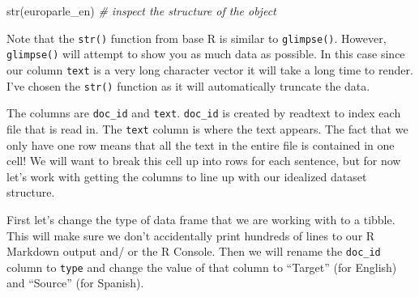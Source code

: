 \documentclass[
  letterpaper,
  DIV=11,
  numbers=noendperiod]{scrreport}
\newenvironment{Shaded}{\begin{snugshade}}{\end{snugshade}}
\newcommand{\CommentTok}[1]{\textcolor[rgb]{0.00,0.00,0.00}{\textit{#1}}}
\newcommand{\FunctionTok}[1]{\textcolor[rgb]{0.00,0.00,0.00}{#1}}
\newcommand{\NormalTok}[1]{\textcolor[rgb]{0.00,0.00,0.00}{#1}}
\theoremstyle{definition}
\theoremstyle{remark}
\begin{document}
\begin{Shaded}
\begin{Highlighting}[]
\FunctionTok{str}\NormalTok{(europarle\_en) }\CommentTok{\# inspect the structure of the object}
\end{Highlighting}
\end{Shaded}

\begin{tcolorbox}[enhanced jigsaw, breakable, arc=.35mm, opacityback=0, bottomrule=.15mm, colback=white, opacitybacktitle=0.6, colframe=quarto-callout-warning-color-frame, toptitle=1mm, colbacktitle=quarto-callout-warning-color!10!white, left=2mm, leftrule=.75mm, toprule=.15mm, title=\textcolor{quarto-callout-warning-color}{\faExclamationTriangle}\hspace{0.5em}{Tip}, bottomtitle=1mm, coltitle=black, titlerule=0mm, rightrule=.15mm]

Note that the \texttt{str()} function from base R is similar to
\texttt{glimpse()}. However, \texttt{glimpse()} will attempt to show you
as much data as possible. In this case since our column \texttt{text} is
a very long character vector it will take a long time to render. I've
chosen the \texttt{str()} function as it will automatically truncate the
data.

\end{tcolorbox}

The columns are \texttt{doc\_id} and \texttt{text}. \texttt{doc\_id} is
created by readtext to index each file that is read in. The
\texttt{text} column is where the text appears. The fact that we only
have one row means that all the text in the entire file is contained in
one cell! We will want to break this cell up into rows for each
sentence, but for now let's work with getting the columns to line up
with our idealized dataset structure.

First let's change the type of data frame that we are working with to a
tibble. This will make sure we don't accidentally print hundreds of
lines to our R Markdown output and/ or the R Console. Then we will
rename the \texttt{doc\_id} column to \texttt{type} and change the value
of that column to ``Target'' (for English) and ``Source'' (for Spanish).
\end{document}
